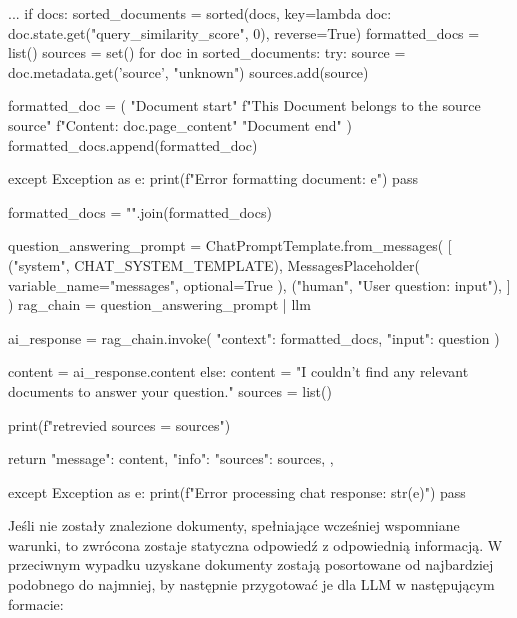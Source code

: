 \documentclass[
a4paper,
12pt,
]{article}
\begin{document}
\begin{python}
        ...
        if docs:
            sorted_documents = sorted(docs, key=lambda doc: doc.state.get("query_similarity_score", 0), reverse=True)
            formatted_docs = list()
            sources = set()
            for doc in sorted_documents:
                try:
                    source = doc.metadata.get('source', "unknown")
                    sources.add(source)

                    formatted_doc = (
                        "Document start\n"
                        f"This Document belongs to the source {source}\n"
                        f"Content: {doc.page_content}\n"
                        "Document end\n"
                    )
                    formatted_docs.append(formatted_doc)
                
                except Exception as e:
                    print(f"Error formatting document: {e}")
                    pass
            
            formatted_docs = "\n\n".join(formatted_docs)
        
            question_answering_prompt = ChatPromptTemplate.from_messages(
                [
                    ("system", CHAT_SYSTEM_TEMPLATE),
                    MessagesPlaceholder(
                        variable_name="messages", 
                        optional=True
                    ),
                    ("human", "User question: {input}"),
                ]
            )
            rag_chain = question_answering_prompt | llm
            
            ai_response = rag_chain.invoke({
                "context": formatted_docs,
                "input": question
            })

            content = ai_response.content
        else:
            content = "I couldn't find any relevant documents to answer your question."
            sources = list()

        print(f"retrevied sources = {sources}")    

        return {
            "message": content,
            "info": {
                "sources": sources,
            },
        }
    
    except Exception as e:
        print(f"Error processing chat response: {str(e)}")
        pass
\end{python}

\noindent{}Jeśli nie zostały znalezione dokumenty, spełniające wcześniej wspomniane warunki, to zwrócona zostaje statyczna odpowiedź z odpowiednią informacją. W przeciwnym wypadku uzyskane dokumenty zostają posortowane od najbardziej podobnego do najmniej, by następnie przygotować je dla LLM w następującym formacie:
\end{document}
